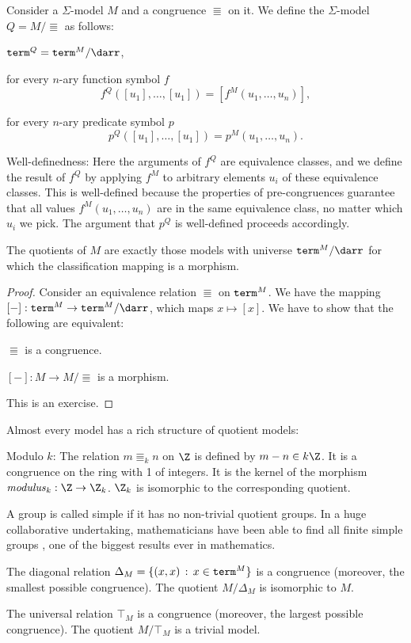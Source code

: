 \begin{definition}
Consider a $\Sigma$-model $M$ and a congruence $\Equiv$ on it.
We define the $\Sigma$-model $Q=M/\Equiv$ as follows:
\begin{compactitem}
\item $\univ^{Q}=\univ^{M}/\Equiv$,
\item for every $n$-ary function symbol $f$
 \[f^{Q}([u_1],\ldots,[u_1])=[f^{M}(u_1,\ldots,u_n)],\]
\item for every $n$-ary predicate symbol $p$
 \[p^{Q}([u_1],\ldots,[u_1])=p^{M}(u_1,\ldots,u_n).\]
\end{compactitem}

Well-definedness:
Here the arguments of $f^Q$ are equivalence classes, and we define the result of $f^Q$ by applying $f^M$ to arbitrary elements $u_i$ of these equivalence classes.
This is well-defined because the properties of pre-congruences guarantee that all values $f^M(u_1,\ldots,u_n)$ are in the same equivalence class, no matter which $u_i$ we pick.
The argument that $p^Q$ is well-defined proceeds accordingly.
\end{definition}

\begin{theorem}
The quotients of $M$ are exactly those models with universe $\univ^M/\Equiv$ for which the classification mapping is a morphism.
\end{theorem}
\begin{proof}
Consider an equivalence relation $\Equiv$ on $\mathtt{term}^M$.
We have the mapping $[-]:\univ^M\to \univ^M/\Equiv$, which maps $x\mapsto [x]$.
We have to show that the following are equivalent:
\begin{compactenum}
 \item $\Equiv$ is a congruence.
 \item $[-]:M\to M/\Equiv$ is a morphism.
\end{compactenum}
This is an exercise.
\end{proof}

\begin{example}
Almost every model has a rich structure of quotient models:
\begin{compactitem}
\item Modulo $k$: The relation $m\Equiv_k n$ on $\Z$ is defined by $m-n\in k\Z$. It is a congruence on the ring with 1 of integers.
It is the kernel of the morphism $\modulus_k:\Z\to\Z_k$.
$\Z_k$ is isomorphic to the corresponding quotient.
\item A group is called simple if it has no non-trivial quotient groups. In a huge collaborative undertaking, mathematicians have been able to find all finite simple groups \cite{finitegroups1}, one of the biggest results ever in mathematics.
\item The diagonal relation $\Delta_M=\{(x,x)\,:\,x\in \mathtt{term}^M\}$ is a congruence (moreover, the smallest possible congruence).
The quotient $M/\Delta_M$ is isomorphic to $M$.
\item The universal relation $\top_M$ is a congruence (moreover, the largest possible congruence).
The quotient $M/\top_M$ is a trivial model.
\end{compactitem}
\end{example}


